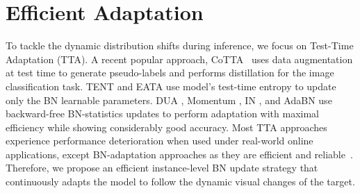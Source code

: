 \section{Efficient Adaptation}
To tackle the dynamic distribution shifts during inference, we focus on Test-Time Adaptation (TTA). A recent popular approach, CoTTA~\cite{wang2022continual} uses data augmentation at test time to generate pseudo-labels and performs distillation for the image classification task. TENT \cite{wang2020tent} and EATA \cite{niu2022efficient} use model's test-time entropy to update only the BN learnable parameters. DUA \cite{mirza2022norm}, Momentum \cite{schneider2020improving}, IN \cite{pan2018two}, and AdaBN \cite{li2016revisiting} use backward-free BN-statistics updates to perform adaptation with maximal efficiency while showing considerably good accuracy. Most TTA approaches experience performance deterioration when used under real-world online applications, except BN-adaptation approaches as they are efficient and reliable~\cite{alfarra2023revisiting}. Therefore, we propose an efficient instance-level BN update strategy that continuously adapts the model to follow the dynamic visual changes of the target.
